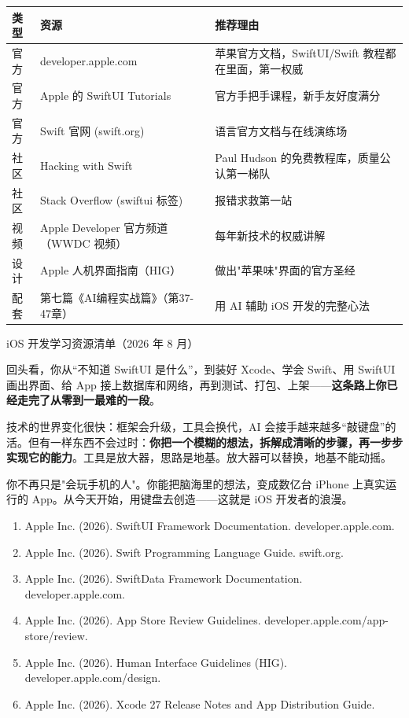 \begin{center}
\begin{tabularx}{\linewidth}{|X|X|X|}
\hline
\textbf{类型} & \textbf{资源} & \textbf{推荐理由} \tabularnewline
\hline
官方 & developer.apple.com & 苹果官方文档，SwiftUI/Swift 教程都在里面，第一权威 \tabularnewline
官方 & Apple 的 SwiftUI Tutorials & 官方手把手课程，新手友好度满分 \tabularnewline
官方 & Swift 官网 (swift.org) & 语言官方文档与在线演练场 \tabularnewline
社区 & Hacking with Swift & Paul Hudson 的免费教程库，质量公认第一梯队 \tabularnewline
社区 & Stack Overflow (swiftui 标签) & 报错求救第一站 \tabularnewline
视频 & Apple Developer 官方频道（WWDC 视频） & 每年新技术的权威讲解 \tabularnewline
设计 & Apple 人机界面指南（HIG） & 做出"苹果味"界面的官方圣经 \tabularnewline
配套 & 第七篇《AI编程实战篇》（第37-47章） & 用 AI 辅助 iOS 开发的完整心法 \tabularnewline
\hline
\end{tabularx}
\end{center}

\begin{center}\small\color{gray}iOS 开发学习资源清单（2026 年 8 月）\end{center}


回头看，你从“不知道 SwiftUI 是什么”，到装好 Xcode、学会 Swift、用 SwiftUI 画出界面、给 App 接上数据库和网络，再到测试、打包、上架——\textbf{这条路上你已经走完了从零到一最难的一段}。

技术的世界变化很快：框架会升级，工具会换代，AI 会接手越来越多“敲键盘”的活。但有一样东西不会过时：\textbf{你把一个模糊的想法，拆解成清晰的步骤，再一步步实现它的能力}。工具是放大器，思路是地基。放大器可以替换，地基不能动摇。

你不再只是"会玩手机的人"。你能把脑海里的想法，变成数亿台 iPhone 上真实运行的 App。从今天开始，用键盘去创造——这就是 iOS 开发者的浪漫。


\begin{enumerate}
  \item Apple Inc. (2026). SwiftUI Framework Documentation. developer.apple.com.
  \item Apple Inc. (2026). Swift Programming Language Guide. swift.org.
  \item Apple Inc. (2026). SwiftData Framework Documentation. developer.apple.com.
  \item Apple Inc. (2026). App Store Review Guidelines. developer.apple.com/app-store/review.
  \item Apple Inc. (2026). Human Interface Guidelines (HIG). developer.apple.com/design.
  \item Apple Inc. (2026). Xcode 27 Release Notes and App Distribution Guide.
\end{enumerate}
